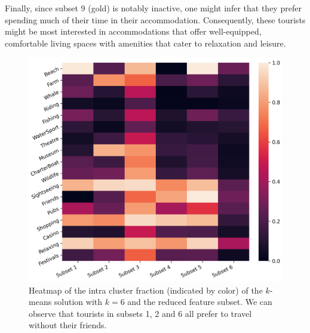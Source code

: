 \documentclass[article]{ajs}
\begin{document}
Finally, since subset 9 (gold) is notably inactive, one might infer that they prefer spending much of their time in their accommodation. Consequently, these tourists might be most interested in accommodations that offer well-equipped, comfortable living spaces with amenities that cater to relaxation and leisure.


\begin{figure}[h!]
    \centering
    \includegraphics[width=1\textwidth]{aus_heatmap.png}
    \caption{Heatmap of the intra cluster fraction (indicated by color) of the $k$-means solution with \( k = 6 \) and the reduced feature subset. We can observe that tourists in subsets 1, 2 and 6 all prefer to travel without their friends.}
    \label{fig:aus_heatmapg}
\end{figure}
\end{document}
